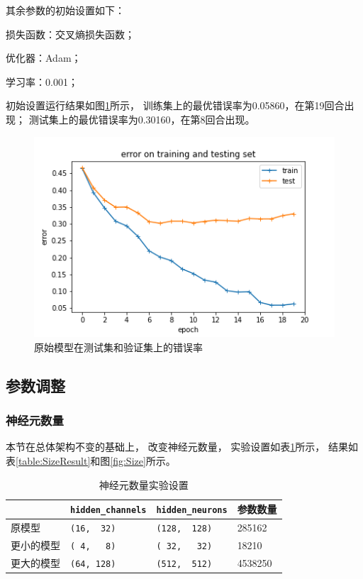 \documentclass{article}
\begin{document}
其余参数的初始设置如下：

损失函数：交叉熵损失函数；

优化器：Adam；

学习率：0.001；

初始设置运行结果如图\ref{fig:Original}所示，
训练集上的最优错误率为0.05860，在第19回合出现；
测试集上的最优错误率为0.30160，在第8回合出现。

\begin{figure}[h]
\includegraphics[width=\textwidth]
{Result/NN Original/figure.png}
\caption{原始模型在测试集和验证集上的错误率}
\label{fig:Original}
\end{figure}

\subsection{参数调整}

\subsubsection{神经元数量}

本节在总体架构不变的基础上，
改变神经元数量，
实验设置如表\ref{table:SizeSet}所示，
结果如表\ref{table:SizeResult}和图\ref{fig:Size}所示。

\begin{table}[h]
\centering
\begin{tabular}{|l|l|l|l|} 
\hline
& \verb|hidden_channels| & \verb|hidden_neurons| & 参数数量\\
\hline
原模型 & \verb|(16,  32)| & \verb|(128,  128)| & 285162 \\
更小的模型 & \verb|( 4,   8)| & \verb|( 32,   32)| & 18210 \\
更大的模型 & \verb|(64, 128)| & \verb|(512,  512)| & 4538250\\
\hline
\end{tabular}
\caption{神经元数量实验设置}
\label{table:SizeSet}
\end{table}
\end{document}
